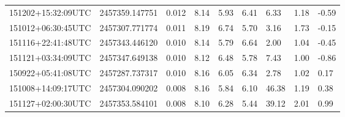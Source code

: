 \begin{table}[ht!]
\begin{center}
\begin{tabularx}{1.0\textwidth}{lllllllll}
151202+15:32:09UTC & 2457359.147751 &      0.012 & 8.14 & 5.93 & 6.41 & 6.33 & 1.18 & -0.59 \\
151012+06:30:45UTC & 2457307.771774 &      0.011 & 8.19 & 6.74 & 5.70 & 3.16 & 1.73 & -0.15 \\
151116+22:41:48UTC & 2457343.446120 &      0.010 & 8.14 & 5.79 & 6.64 & 2.00 & 1.04 & -0.45 \\
151121+03:34:09UTC & 2457347.649138 &      0.010 & 8.12 & 6.48 & 5.78 & 7.43 & 1.00 & -0.86 \\
150922+05:41:08UTC & 2457287.737317 &      0.010 & 8.16 & 6.05 & 6.34 & 2.78 & 1.02 & 0.17 \\
151008+14:09:17UTC & 2457304.090202 &      0.008 & 8.16 & 5.84 & 6.10 & 46.38 & 1.19 & 0.38 \\
151127+02:00:30UTC & 2457353.584101 &      0.008 & 8.10 & 6.28 & 5.44 & 39.12 & 2.01 & 0.99 \\


\end{tabularx}
  \end{center}
\end{table}

